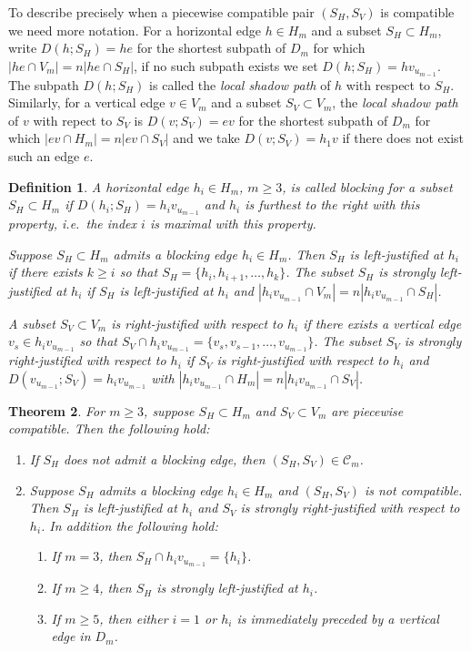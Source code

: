 \documentclass{amsart}
\newtheorem{theorem}{Theorem}[section]
\newtheorem{definition}[theorem]{Definition}
\newcommand{\cC}{\mathcal{C}}
\begin{document}
To describe precisely when a piecewise compatible pair $(S_H,S_V)$ is compatible we need more notation.
For a horizontal edge $h\in H_m$ and a subset $S_H\subset H_m$, write $D(h;S_H)=he$ for the shortest subpath of $D_m$ for which $|he\cap V_m|=n|he\cap S_H|$, if no such subpath exists we set $D(h;S_H)=hv_{u_{m-1}}$.
The subpath $D(h;S_H)$ is called the \emph{local shadow path} of $h$ with respect to $S_H$.
Similarly, for a vertical edge $v\in V_m$ and a subset $S_V\subset V_m$, the \emph{local shadow path} of $v$ with repect to $S_V$ is $D(v;S_V)=ev$ for the shortest subpath of $D_m$ for which $|ev\cap H_m|=n|ev\cap S_V|$ and we take $D(v;S_V)=h_1v$ if there does not exist such an edge $e$.
\begin{definition}
  \cite[Definition 3.17]{rupel}
  A horizontal edge $h_i\in H_m$, $m\ge3$, is called \emph{blocking} for a subset $S_H\subset H_m$ if $D(h_i;S_H)=h_iv_{u_{m-1}}$ and $h_i$ is furthest to the right with this property, i.e.\ the index $i$ is maximal with this property. 

  Suppose $S_H\subset H_m$ admits a blocking edge $h_i\in H_m$.
  Then $S_H$ is \emph{left-justified at $h_i$} if there exists $k\ge i$ so that $S_H=\{h_i,h_{i+1},\ldots,h_k\}$.
  The subset $S_H$ is \emph{strongly left-justified at $h_i$} if $S_H$ is left-justified at $h_i$ and $|h_iv_{u_{m-1}}\cap V_m|=n|h_iv_{u_{m-1}}\cap S_H|$.

  A subset $S_V\subset V_m$ is \emph{right-justified with respect to $h_i$} if there exists a vertical edge $v_s\in h_iv_{u_{m-1}}$ so that $S_V\cap h_iv_{u_{m-1}}=\{v_s,v_{s-1},\ldots,v_{u_{m-1}}\}$.
  The subset $S_V$ is \emph{strongly right-justified with respect to $h_i$} if $S_V$ is right-justified with respect to $h_i$ and $D(v_{u_{m-1}};S_V)=h_iv_{u_{m-1}}$ with $|h_iv_{u_{m-1}}\cap H_m|=n|h_iv_{u_{m-1}}\cap S_V|$.
\end{definition}

\begin{theorem}
  \cite[Theorem 3.20 and Corollary 3.22]{rupel}
  \label{th:blocking edge conditions}
  For $m\ge3$, suppose $S_H\subset H_m$ and $S_V\subset V_m$ are piecewise compatible. 
  Then the following hold:
  \begin{enumerate}
    \item If $S_H$ does not admit a blocking edge, then $(S_H,S_V)\in\cC_m$.
    \item Suppose $S_H$ admits a blocking edge $h_i\in H_m$ and $(S_H,S_V)$ is not compatible.
      Then $S_H$ is left-justified at $h_i$ and $S_V$ is strongly right-justified with respect to $h_i$.
      In addition the following hold:
      \begin{enumerate}
        \item If $m=3$, then $S_H\cap h_iv_{u_{m-1}}=\{h_i\}$.
        \item If $m\ge4$, then $S_H$ is strongly left-justified at $h_i$.
        \item If $m\ge5$, then either $i=1$ or $h_i$ is immediately preceded by a vertical edge in $D_m$.
      \end{enumerate}
  \end{enumerate}
\end{theorem}
\end{document}
